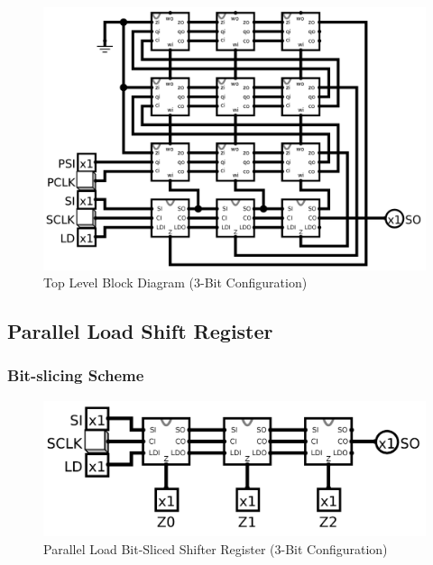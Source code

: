 \documentclass{article}
\begin{document}
    \begin{figure}[H]
        \centering
        \includegraphics[width=\linewidth]{../../logisim/top.png}
        \caption{Top Level Block Diagram (3-Bit Configuration)}
    \end{figure}

    \subsection{Parallel Load Shift Register}

        \subsubsection{Bit-slicing Scheme}
        \begin{figure}[H]
            \centering
            \includegraphics[width=\linewidth]{../../logisim/shift.png}
            \caption{Parallel Load Bit-Sliced Shifter Register (3-Bit Configuration)}
        \end{figure}
\end{document}
